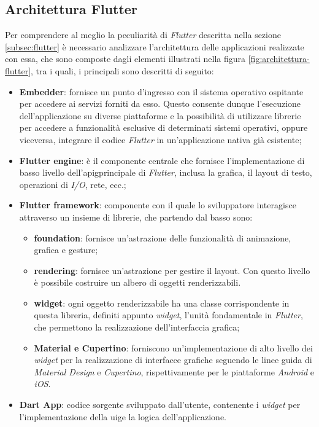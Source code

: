 \subsection{Architettura Flutter}
\label{subsec:architettura-flutter}

Per comprendere al meglio la peculiarità di \emph{Flutter} descritta nella sezione \ref{subsec:flutter} è necessario analizzare l'architettura\cite{site:flutter-architecture} delle applicazioni realizzate con essa, che sono composte dagli elementi illustrati nella figura \ref{fig:architettura-flutter}, tra i quali, i principali sono descritti di seguito:
\begin{itemize}
    \item \textbf{Embedder}: fornisce un punto d'ingresso con il sistema operativo ospitante per accedere ai servizi forniti da esso. Questo consente dunque l'esecuzione dell'applicazione su diverse piattaforme e la possibilità di utilizzare librerie per accedere a funzionalità esclusive di determinati sistemi operativi, oppure viceversa, integrare il codice \emph{Flutter} in un'applicazione nativa già esistente;
    \item \textbf{Flutter engine}: è il componente centrale che fornisce l'implementazione di basso livello dell'\gls{apig}\glsoccur principale di \emph{Flutter}, inclusa la grafica, il layout di testo, operazioni di \emph{I/O}, rete, ecc.;
    \item \textbf{Flutter framework}: componente con il quale lo sviluppatore interagisce attraverso un insieme di librerie, che partendo dal basso sono:
    \begin{itemize}
        \item \textbf{foundation}: fornisce un'astrazione delle funzionalità di animazione, grafica e \gls{gesture}\glsoccur;
        \item \textbf{rendering}: fornisce un'astrazione per gestire il layout. Con questo livello è possibile costruire un albero di oggetti renderizzabili.
        \item \textbf{widget}: ogni oggetto renderizzabile ha una classe corrispondente in questa libreria, definiti appunto \emph{widget}, l'unità fondamentale in \emph{Flutter}, che permettono la realizzazione dell'interfaccia grafica;
        \item \textbf{Material e Cupertino}: forniscono un'implementazione di alto livello dei \emph{widget} per la realizzazione di interfacce grafiche seguendo le linee guida di \emph{Material Design} e \emph{Cupertino}, rispettivamente per le piattaforme \emph{Android} e \emph{iOS}.
    \end{itemize}
    \item \textbf{Dart App}: codice sorgente sviluppato dall'utente, contenente i \emph{widget} per l'implementazione della \gls{uig}\glsoccur e la logica dell'applicazione.
\end{itemize}

